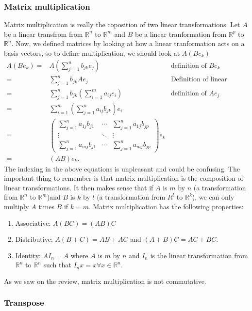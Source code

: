\documentclass[12pt,reqno]{amsart}
\def\R{\mathbb{R}}
\theoremstyle{definition}
\begin{document}
\subsubsection{Matrix multiplication}
Matrix multiplication is really the coposition of two linear
transformations. Let $A$ be a linear transfrom from $\R^n$ to $\R^m$
and $B$ be a linear tranformation from $\R^p$ to $\R^n$. Now, we
defined matrices by looking at how a linear tranformation acts on a
basis vectors, so to define multiplication, we should look at $A(B
e_k)$
\begin{align*}
  A(B e_k) = & A (\sum_{j=1}^n b_{jk} e_j) & \text{definition of $Be_k$}\\
  = & \sum_{j=1}^n b_{jk} A e_j & \text{Definition of linear
    transformtion} \\
  = & \sum_{j=1}^n b_{jk} \left(\sum_{i=1}^m a_{ij} e_i\right)  &
  \text{definition of $Ae_j$} \\
  = & \sum_{i=1}^m \left(\sum_{j=1}^n a_{ij} b_{jk} \right) e_i \\
  = & \begin{pmatrix} 
    \sum_{j=1}^n a_{1j} b_{j1} & \cdots & \sum_{j=1}^n a_{1j} b_{jp} \\
    \vdots & \ddots & \vdots \\
    \sum_{j=1}^n a_{mj} b_{j1} & \cdots & \sum_{j=1}^n a_{mj} b_{jp}
  \end{pmatrix} e_k  \\
  = & (AB)e_k .
\end{align*}
The indexing in the above equations is unpleasant and could be
confusing. The important thing to remember is that matrix
multiplication is the composition of linear transformations. It then
makes sense that if $A$ is $m$ by $n$ (a transformation from $\R^n$ to
$\R^m$)and $B$ is $k$ by $l$ (a transformation from $R^l$ to $\R^k$),
we can only multiply $A$ times $B$ if $k = m$. Matrix multiplication
has the following properties:
\begin{enumerate}
\item Associative: $A(BC) = (AB) C$
\item Distributive: $A(B+C) = AB + AC$ and $(A+B)C = AC + BC$. 
\item Identity: $AI_n = A$ where $A$ is $m$ by $n$ and $I_n$ is the linear
  transformation from $\R^n$ to $\R^n$ such that $I_nx = x \forall x \in
  \R^n$.
\end{enumerate}
As we saw on the review, matrix multiplication is not commutative. 

\subsubsection{Transpose}
\end{document}
